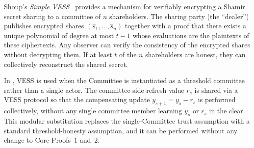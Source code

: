 Shoup's \emph{Simple VESS}~\cite{shoup2024simple} provides a mechanism for verifiably encrypting a Shamir secret sharing to a committee of $n$ shareholders. The sharing party (the ``dealer'') publishes encrypted shares $(\hat{s}_1, \ldots, \hat{s}_n)$ together with a proof that there exists a unique polynomial of degree at most $t-1$ whose evaluations are the plaintexts of these ciphertexts. Any observer can verify the consistency of the encrypted shares without decrypting them. If at least $t$ of the $n$ shareholders are honest, they can collectively reconstruct the shared secret.

In \thunderbolt, VESS is used when the Committee is instantiated as a threshold committee rather than a single actor. The committee-side refresh value $r_s$ is shared via a VESS protocol so that the compensating update $y_{s+1} = y_s - r_s$ is performed collectively, without any single committee member learning $y_s$ or $r_s$ in the clear. This modular substitution replaces the single-Committee trust assumption with a standard threshold-honesty assumption, and it can be performed without any change to Core Proofs~1 and~2.
